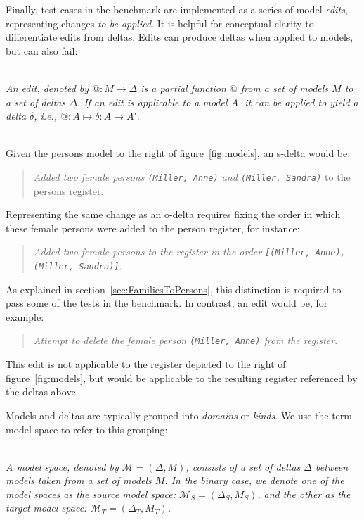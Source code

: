 Finally, test cases in the benchmark are implemented as a series of model \emph{edits}, representing changes \emph{to be applied}.
It is helpful for conceptual clarity to differentiate edits from deltas.
Edits can produce deltas when applied to models, but can also fail:

\begin{definition}[Edit]
\label{def: edit}~\\
\emph{An edit, denoted by $@: M \rightarrow \Delta$ is a partial function $@$ from a set of models $M$ to a set of deltas $\Delta$.
If an edit is applicable to a model $A$, it can be applied to yield a delta $\delta$, i.e., 
$@: A \longmapsto \delta: A \rightarrow A'$}.
\end{definition}

\begin{example}~\\
Given the persons model to the right of figure~\ref{fig:models}, an s-delta would be:
\begin{quote}
\emph{Added two female persons \texttt{(Miller, Anne)} and \texttt{(Miller, Sandra)}} to the persons register.
\end{quote}
Representing the same change as an o-delta requires fixing the order in which these female persons were added to the person register, for instance:
\begin{quote}
\emph{Added two female persons to the register in the order \texttt{[(Miller, Anne), (Miller, Sandra)]}}.
\end{quote}
As explained in section~\ref{sec:FamiliesToPersons}, this distinction is required to pass some of the tests in the benchmark.
In contrast, an edit would be, for example:
\begin{quote}
\emph{Attempt to delete the female person \texttt{(Miller, Anne)} from the register}.    
\end{quote}
This edit is not applicable to the register depicted to the right of figure~\ref{fig:models}, but would be applicable to the resulting register referenced by the deltas above.  
\end{example}

Models and deltas are typically grouped into \emph{domains} or \emph{kinds}.
We use the term model space to refer to this grouping:
%
\begin{definition}
\label{def: model-space}~\\
\emph{A model space, denoted by $\mathcal{M} = (\Delta, M)$, consists of a set of deltas $\Delta$ between models taken from a set of models $M$. 
In the binary case, we denote one of the model spaces as the source model space: $\mathcal{M}_S = (\Delta_S, M_S)$, and the other as the target model space:  $\mathcal{M}_T = (\Delta_T, M_T)$.}
\end{definition}

